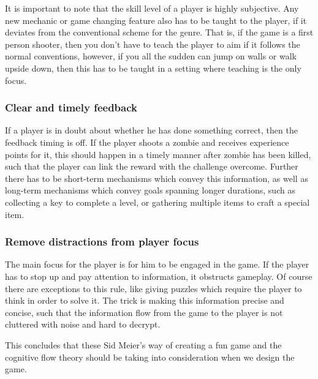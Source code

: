 It is important to note that the skill level of a player is highly subjective.
Any new mechanic or game changing feature also has to be taught to the player, if it deviates from the conventional scheme for the genre. 
That is, if the game is a first person shooter, then you don't have to teach the player to aim if it follows the normal conventions, however, if you all the sudden can jump on walls or walk upside down, then this has to be taught in a setting where teaching is the only focus.

\subsubsection{Clear and timely feedback}
If a player is in doubt about whether he has done something correct, then the feedback timing is off.
If the player shoots a zombie and receives experience points for it, this should happen in a timely manner after zombie has been killed, such that the player can link the reward with the challenge overcome.
Further there has to be short-term mechanisms which convey this information, as well as long-term mechanisms which convey goals spanning longer durations,
such as collecting a key to complete a level, or gathering multiple items to craft a special item.

\subsubsection{Remove distractions from player focus}\label{introductions:makingthegamefun:removedistractionsfromplayerfocus}
The main focus for the player is for him to be engaged in the game.
If the player has to stop up and pay attention to information, it obstructs gameplay.
Of course there are exceptions to this rule, like giving puzzles which require the player to think in order to solve it.
The trick is making this information precise and concise, such that the information flow from the game to the player is not cluttered with noise and hard to decrypt.

This concludes that these Sid Meier's way of creating a fun game and the cognitive flow theory should be taking into consideration when we design the game.
